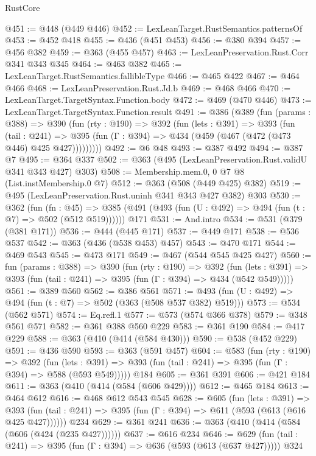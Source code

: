 \begin{lexlean}{RustCore}
\begin{coremodule}
@451 := @448 (@449 @446)
@452 := LexLeanTarget.RustSemantics.patternsOf
@453 := @452 @418
@455 := @436 (@451 @453)
@456 := @380 @394
@457 := @456 @382
@459 := @363 (@455 @457)
@463 := LexLeanPreservation.Rust.Corr @341 @343 @345
@464 := @463 @382
@465 := LexLeanTarget.RustSemantics.fallibleType
@466 := @465 @422
@467 := @464 @466
@468 := LexLeanPreservation.Rust.Jd.b
@469 := @468 @466
@470 := LexLeanTarget.TargetSyntax.Function.body
@472 := @469 (@470 @446)
@473 := LexLeanTarget.TargetSyntax.Function.result
@491 := @386
    (@389
      (fun (params : @388) =>
      @390
        (fun (rty : @190) =>
        @392
          (fun (lets : @391) =>
          @393
            (fun (tail : @241) =>
            @395 (fun (Γ : @394) => @434 (@459 (@467 (@472 (@473 @446) @425 @427)))))))))
@492 := @6 @48
@493 := @387 @492
@494 := @387 @7
@495 := @364 @337
@502 := @363 (@495 (LexLeanPreservation.Rust.validU @341 @343 @427) @303)
@508 := Membership.mem.{0, 0} @7 @8 (List.instMembership.{0} @7)
@512 := @363 (@508 (@449 @425) @382)
@519 := @495 (LexLeanPreservation.Rust.uninh @341 @343 @427 @382) @303
@530 := @362
    (fun (fn : @45) =>
    @385 (@491 (@493 (fun (U : @492) => @494 (fun (t : @7) => @502 (@512 @519))))))
    @171
@531 := And.intro
@534 := @531 (@379 (@381 @171))
@536 := @444 (@445 @171)
@537 := @449 @171
@538 := @536 @537
@542 := @363 (@436 (@538 @453) @457)
@543 := @470 @171
@544 := @469 @543
@545 := @473 @171
@549 := @467 (@544 @545 @425 @427)
@560 := fun (params : @388) =>
  @390
    (fun (rty : @190) =>
    @392
      (fun (lets : @391) => @393 (fun (tail : @241) => @395 (fun (Γ : @394) => @434 (@542 @549)))))
@561 := @389 @560
@562 := @386 @561
@571 := @493 (fun (U : @492) => @494 (fun (t : @7) => @502 (@363 (@508 @537 @382) @519)))
@573 := @534 (@562 @571)
@574 := Eq.refl.{1}
@577 := @573 (@574 @366 @378)
@579 := @348 @561 @571
@582 := @361 @388 @560 @229
@583 := @361 @190
@584 := @417 @229
@588 := @363 (@410 (@414 (@584 @430)))
@590 := @538 (@452 @229)
@591 := @436 @590
@593 := @363 (@591 @457)
@604 := @583
    (fun (rty : @190) =>
    @392
      (fun (lets : @391) => @393 (fun (tail : @241) => @395 (fun (Γ : @394) => @588 (@593 @549)))))
    @184
@605 := @361 @391
@606 := @421 @184
@611 := @363 (@410 (@414 (@584 (@606 @429))))
@612 := @465 @184
@613 := @464 @612
@616 := @468 @612 @543 @545
@628 := @605
    (fun (lets : @391) =>
    @393 (fun (tail : @241) => @395 (fun (Γ : @394) => @611 (@593 (@613 (@616 @425 @427))))))
    @234
@629 := @361 @241
@636 := @363 (@410 (@414 (@584 (@606 (@424 (@235 @427))))))
@637 := @616 @234
@646 := @629 (fun (tail : @241) => @395 (fun (Γ : @394) => @636 (@593 (@613 (@637 @427))))) @324

\end{coremodule}
\end{lexlean}

